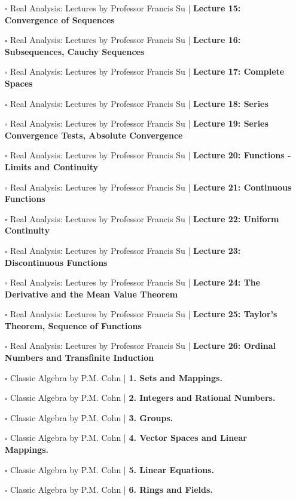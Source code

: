\documentclass[a4, landscape, 12pt]{article}
\newcommand{\checkbox}{$\square$}%
\begin{document}
\begin{itemize}
{}
\item [\checkbox] Real Analysis: Lectures by Professor Francis Su  | \textbf{Lecture 15: Convergence of Sequences
}
\item [\checkbox] Real Analysis: Lectures by Professor Francis Su  | \textbf{Lecture 16: Subsequences, Cauchy Sequences
}
\item [\checkbox] Real Analysis: Lectures by Professor Francis Su  | \textbf{Lecture 17: Complete Spaces
}
\item [\checkbox] Real Analysis: Lectures by Professor Francis Su  | \textbf{Lecture 18: Series
}
\item [\checkbox] Real Analysis: Lectures by Professor Francis Su  | \textbf{Lecture 19: Series Convergence Tests, Absolute Convergence
}
\item [\checkbox] Real Analysis: Lectures by Professor Francis Su  | \textbf{Lecture 20: Functions - Limits and Continuity
}
\item [\checkbox] Real Analysis: Lectures by Professor Francis Su  | \textbf{Lecture 21: Continuous Functions
}
\item [\checkbox] Real Analysis: Lectures by Professor Francis Su  | \textbf{Lecture 22: Uniform Continuity
}
\item [\checkbox] Real Analysis: Lectures by Professor Francis Su  | \textbf{Lecture 23: Discontinuous Functions
}
\item [\checkbox] Real Analysis: Lectures by Professor Francis Su  | \textbf{Lecture 24: The Derivative and the Mean Value Theorem
}
\item [\checkbox] Real Analysis: Lectures by Professor Francis Su  | \textbf{Lecture 25: Taylor's Theorem, Sequence of Functions
}
\item [\checkbox] Real Analysis: Lectures by Professor Francis Su  | \textbf{Lecture 26: Ordinal Numbers and Transfinite Induction
}
\item [\checkbox] Classic Algebra by P.M. Cohn  | \textbf{1. Sets and Mappings.
}
\item [\checkbox] Classic Algebra by P.M. Cohn  | \textbf{2. Integers and Rational Numbers.
}
\item [\checkbox] Classic Algebra by P.M. Cohn  | \textbf{3. Groups.
}
\item [\checkbox] Classic Algebra by P.M. Cohn  | \textbf{4. Vector Spaces and Linear Mappings.
}
\item [\checkbox] Classic Algebra by P.M. Cohn  | \textbf{5. Linear Equations.
}
\item [\checkbox] Classic Algebra by P.M. Cohn  | \textbf{6. Rings and Fields.
}
\end{itemize}
\end{document}
